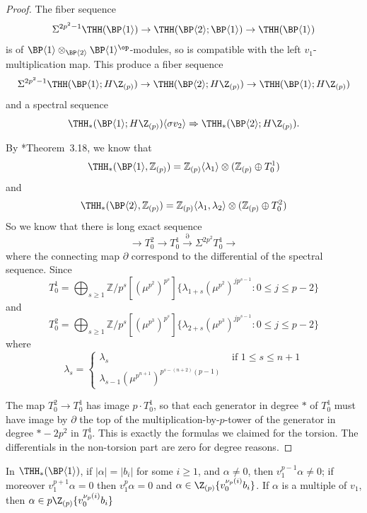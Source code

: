 \begin{proof}
  The fiber sequence 
  \[ 
    \Sigma^{2p^2-1}\THH(\BP\langle 1\rangle)\to \THH(\BP\langle 2\rangle ;\BP\langle 1\rangle)\to \THH(\BP\langle 1\rangle)
  \]
  is of $\BP\langle 1\rangle \otimes_{\BP \langle 2 \rangle} \BP\langle 1\rangle^\op$-modules, so is compatible with the left $v_1$-multiplication map. This produce a fiber sequence
  \begin{equation}
    \Sigma^{2p^2-1}\THH(\BP\langle 1\rangle; H\Z_{(p)})\to \THH(\BP\langle 2\rangle ; H\Z_{(p)})\to \THH(\BP\langle 1\rangle; H\Z_{(p)})
  \end{equation}
  and a spectral sequence
  \begin{equation}
    \THH_*(\BP\langle 1\rangle; H \Z_{(p)}) \langle \sigma v_2 \rangle \Rightarrow \THH_*(\BP \langle 2 \rangle; H \Z_{(p)}).
  \end{equation}

  By \cite{ACH24}*{Theorem~3.18}, we know that 
  \[
    \THH_*(\BP\langle 1\rangle,\mathbb{Z}_{(p)})=\mathbb{Z}_{(p)}\langle \lambda_1\rangle \otimes (\mathbb{Z}_{(p)}\oplus T_0^1)
  \]
  and 
  \[
    \THH_*(\BP\langle 2\rangle,\mathbb{Z}_{(p)})=\mathbb{Z}_{(p)}\langle \lambda_1,\lambda_2\rangle \otimes (\mathbb{Z}_{(p)}\oplus T_0^2)
  \]
  So we know that there is long exact sequence 
  \[ 
    \to T_0^{2} \to T_0^1\overset{\partial}{\to} \Sigma^{2p^2}T_0^1 \to 
  \]
  where the connecting map $\partial$ correspond to the differential of the spectral sequence.
  Since 
  \[ 
    T_0^1=\bigoplus_{s\ge 1}\mathbb{Z}/p^s[(\mu^{p^2})^{p^s}]\{\lambda_{1+s}(\mu^{p^2})^{jp^{s-1}}: 0\le j\le p-2\}
  \]
  and 
  \[ 
    T_0^2=\bigoplus_{s\ge 1}\mathbb{Z}/p^s[(\mu^{p^3})^{p^s}]\{\lambda_{2+s}(\mu^{p^3})^{jp^{s-1}}: 0\le j\le p-2\}
  \]
  where 
  \[ 
    \lambda_{s}=\begin{cases} \lambda_s & \text{ if } 1\le s\le n+1 \\ 
      \lambda_{s-1}(\mu^{p^{n+1}})^{p^{s-(n+2)}(p-1)}
    \end{cases}
  \]
  
  The map $T_0^2 \rightarrow T_0^1$ has image $p \cdot T_0^1$, so that each generator in degree $*$ of $T_0^1$ must have image by $\partial$ the top of the multiplication-by-$p$-tower of the generator in degree $*-2p^2$ in $T_0^1$. This is exactly the formulas we claimed for the torsion. The differentials in the non-torsion part are zero for degree reasons.
\end{proof}

\begin{lemma} \label{lem:thhell1}
  In $\THH_*(\BP\langle 1\rangle)$, if $|\alpha| = |b_i|$ for some $i \geq 1$, and $\alpha \neq 0$, then $v_1^{p-1} \alpha \neq 0$; if moreover $v_1^{p+1} \alpha = 0$ then $v_1^p \alpha = 0$ and $\alpha \in \Z_{(p)} \{ v_0^{\nu_p(i)}b_i \}$. If $\alpha$ is a multiple of $v_1$, then $\alpha \in p\Z_{(p)} \{ v_0^{\nu_p(i)}b_i \}$ 
\end{lemma}

